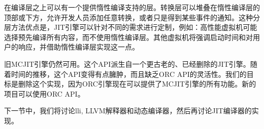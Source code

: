 在编译层之上可以有一个提供惰性编译支持的层。转换层可以堆叠在惰性编译层的顶部或下方，允许开发人员添加任意转换，或者只是得到某些事件的通知。这种分层方法优点是，JIT引擎可以针对不同的需求进行定制，例如：高性能虚拟机可能选择预先编译所有内容，而不使用惰性编译层。其他虚拟机将强调启动时间和对用户的响应，并借助惰性编译层实现这一点。\par

旧MCJIT引擎仍然可用。这个API派生自一个更古老的、已经删除的JIT引擎。随着时间的推移，这个API变得有点臃肿，而且缺乏ORC API的灵活性。我们的目标是删除这个实现，因为ORC引擎现在可以提供了MCJIT引擎的所有功能。新的项目可以使用ORC API。\par

下一节中，我们将讨论lli, LLVM解释器和动态编译器，然后再讨论JIT编译器的实现。\par






























































